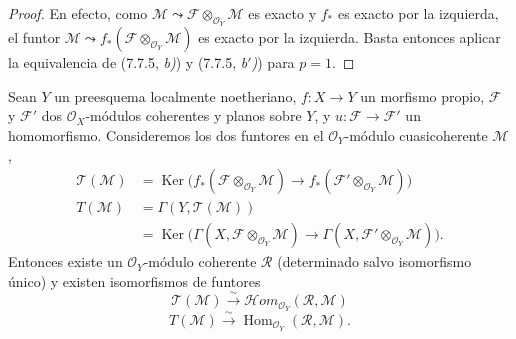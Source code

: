 \begin{proof}
En efecto, como $\mathscr M\leadsto\mathscr F\otimes_{\mathscr O_Y}\mathscr M$ es exacto
 y $f_*$ es exacto por la izquierda, el funtor
$\mathscr M\leadsto f_*(\mathscr F\otimes_{\mathscr O_Y}\mathscr M)$ es exacto por la izquierda. Basta entonces aplicar la equivalencia de (7.7.5, \emph{b)}) y (7.7.5, \emph{b$'$)}) para $p=1$.
\end{proof}

\begin{corollary}[7.7.7]
\label{III.7.7.7}
Sean $Y$ un preesquema localmente noetheriano, $f:X\to Y$ un morfismo propio,
$\mathscr F$ y $\mathscr F'$ dos $\mathscr O_X$-módulos coherentes y planos
sobre $Y$, y $u:\mathscr F\to\mathscr F'$ un homomorfismo. Consideremos los
dos funtores en el $\mathscr O_Y$-módulo cuasicoherente $\mathscr M$,
\begin{align*}
  \mathscr T(\mathscr M)
  &=
  \operatorname{Ker}
  \bigl(
    f_*(\mathscr F\otimes_{\mathscr O_Y}\mathscr M)
    \longrightarrow
    f_*(\mathscr F'\otimes_{\mathscr O_Y}\mathscr M)
  \bigr)\\
  T(\mathscr M)
  &=
  \Gamma(Y,\mathscr T(\mathscr M))\\
  &=
  \operatorname{Ker}
  \bigl(
    \Gamma(X,\mathscr F\otimes_{\mathscr O_Y}\mathscr M)
    \longrightarrow
    \Gamma(X,\mathscr F'\otimes_{\mathscr O_Y}\mathscr M)
  \bigr).
\end{align*}
Entonces existe un $\mathscr O_Y$-módulo coherente $\mathscr R$ (determinado
salvo isomorfismo único) y existen isomorfismos de funtores
\[
  \mathscr T(\mathscr M)
  \xrightarrow{\sim}
  \mathscr{H}\!om_{\mathscr O_Y}(\mathscr R,\mathscr M)
  \tag{7.7.7.1}\label{III.7.7.7.1.fr}
\]
\[
  T(\mathscr M)
  \xrightarrow{\sim}
  \operatorname{Hom}_{\mathscr O_Y}(\mathscr R,\mathscr M).
  \tag{7.7.7.2}\label{III.7.7.7.2.fr}
\]
\end{corollary}

